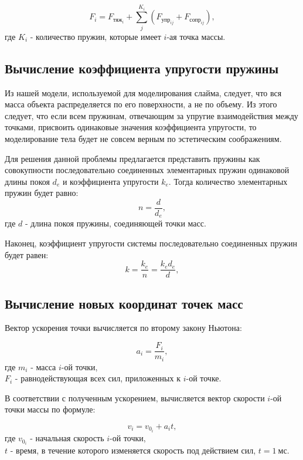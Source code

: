 \begin{equation}\label{f}
	F_i = F_{\text{тяж}_i} + \sum_{j}^{K_i} (F_{\text{упр}_{ij}} + F_{\text{сопр}_{ij}}),
\end{equation}
где $K_i$ - количество пружин, которые имеет $i$-ая точка массы.

\subsection{Вычисление коэффициента упругости пружины}

Из нашей модели, используемой для моделирования слайма, следует, что вся масса объекта распределяется по его поверхности, а не по объему. Из этого следует, что если всем пружинам, отвечающим за упругие взаимодействия между точками, присвоить одинаковые значения коэффициента упругости, то моделирование тела будет не совсем верным по эстетическим соображениям.

Для решения данной проблемы предлагается представить пружины как совокупности последовательно соединенных элементарных пружин одинаковой длины покоя $d_e$ и коэффициента упругости $k_e$. Тогда количество элементарных пружин будет равно:
\begin{equation}\label{stifn}
	n = \frac{d}{d_e},
\end{equation}
где $d$ - длина покоя пружины, соединяющей точки масс.

Наконец, коэффициент упругости системы последовательно соединенных пружин будет равен:
\begin{equation}\label{stif}
	k = \frac{k_e}{n} = \frac{k_e d_e}{d},
\end{equation}

\subsection{Вычисление новых координат точек масс}

Вектор ускорения точки вычисляется по второму закону Ньютона:

\begin{equation}\label{sln}
	a_i = \frac{F_i}{m_i},
\end{equation}
где $m_i$ - масса $i$-ой точки,\\
\text{~~~~~~}$F_i$ - равнодействующая всех сил, приложенных к $i$-ой точке.

В соответствии с полученным ускорением, вычисляется вектор скорости $i$-ой точки массы по формуле:

\begin{equation}\label{velocity}
	v_i = v_{0_i} + a_i t,
\end{equation}
где $v_{0_i}$ - начальная скорость $i$-ой точки,\\
\text{~~~~~~}$t$ - время, в течение которого изменяется скорость под действием сил, $t = 1~\text{мс}$.

